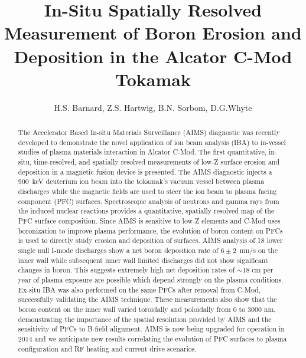 \documentclass[final,3p,times,twocolumn]{elsarticle}
\begin{document}
\begin{frontmatter}

\title{In-Situ Spatially Resolved Measurement of Boron Erosion and Deposition in the Alcator C-Mod Tokamak}

\author{H.S. Barnard, Z.S. Hartwig, B.N. Sorbom, D.G.Whyte}


\begin{abstract}
The Accelerator Based In-situ Materials Surveillance (AIMS) diagnostic was recently developed to demonstrate the novel application of ion beam analysis (IBA) to in-vessel studies of plasma materials interaction in Alcator C-Mod. The first quantitative, in-situ, time-resolved, and spatially resolved measurements of low-Z surface erosion and deposition in a magnetic fusion device is presented. The AIMS diagnostic injects a 900~keV deuterium ion beam into the tokamak's vacuum vessel between plasma discharges while the magnetic fields are used to steer the ion beam to plasma facing component (PFC) surfaces. Spectroscopic analysis of neutrons and gamma rays from the induced nuclear reactions provides a quantitative, spatially resolved map of the PFC surface composition. Since AIMS is sensitive to low-Z elements and C-Mod uses boronization to improve plasma performance, the evolution of boron content on PFCs is used to directly study erosion and deposition of surfaces. AIMS analysis of 18 lower single null I-mode discharges show a net boron deposition rate of $6\pm2$~nm/s on the inner wall while subsequent inner wall limited discharges did not show significant changes in boron. This suggests extremely high net deposition rates of $\sim$18 cm per year of plasma exposure are possible which depend strongly on the plasma conditions. Ex-situ IBA was also performed on the same PFCs after removal from C-Mod, successfully validating the AIMS technique. These measurements also show that the boron content on the inner wall varied toroidally and poloidally from 0 to 3000 nm, demonstrating the importance of the spatial resolution provided by AIMS and the sensitivity of PFCs to B-field alignment. AIMS is now being upgraded for operation in 2014 and we anticipate new results correlating the evolution of PFC surfaces to plasma configuration and RF heating and current drive scenarios.
\end{abstract}


\end{frontmatter}
\end{document}
